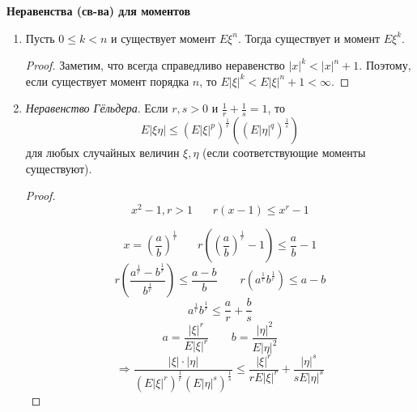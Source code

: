 \begin{center}
	\textbf{Неравенства (св-ва) для моментов}
\end{center}
\begin{enumerate}
	\item Пусть $0 \le k < n$ и существует момент $E\xi^n$. Тогда существует и момент $E\xi^k$.
	\begin{proof}
		Заметим, что всегда справедливо неравенство $|x|^k < |x|^n + 1$. Поэтому, если существует момент порядка $n$, то $E |\xi|^k < E |\xi|^n + 1 < \infty$.
	\end{proof}
	\item \textit{Неравенство Гёльдера}. Если $r, s > 0$ и $\frac{1}{r} + \frac{1}{s} = 1$, то
	\[ E |\xi \eta| \le (E|\xi|^p)^{\frac{1}{r}} ( ( E |\eta|^q )^{\frac{1}{s}} ) \]
	для любых случайных величин $\xi, \eta$ (если соответствующие моменты существуют).
	\begin{proof}
		\[ x^2 - 1, r > 1 ~~~~~~~~ r(x - 1) \le x^r - 1 \]
		\begin{figure}[H]
		\end{figure}
		\[ x = \left( \frac{a}{b} \right)^{\frac{1}{r}} ~~~~~~~~ r \left( \left( \frac{a}{b} \right)^{\frac{1}{r}} - 1 \right) \le \frac{a}{b} - 1 \]
		\[ r \left( \frac{a^{\frac{1}{r}} - b^{\frac{1}{r}}}{b^{\frac{1}{r}}} \right) \le \frac{a - b}{b} ~~~~~~~~~ r (a^{\frac{1}{r}} b^{\frac{1}{r}} ) \le a - b \]
		\[ a^{\frac{1}{r}} b^{\frac{1}{r}} \le \frac{a}{r} + \frac{b}{s} \]
		\[ a = \frac{|\xi|^r}{E |\xi|^r} ~~~~~~~~~ b = \frac{|\eta|^2}{E|\eta|^2} \]
		\[ \Rightarrow \frac{|\xi| \cdot |\eta|}{(E |\xi|^r)^{\frac{1}{r}} (E |\eta|^s)^{\frac{1}{s}}} \le \frac{|\xi|^r}{r E |\xi|^r} + \frac{|\eta|^s}{s E |\eta|^s} \]

\end{proof}
\end{enumerate}

